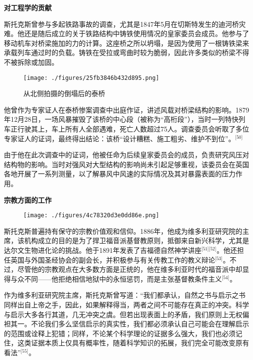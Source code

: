 \textbf{对工程学的贡献}

斯托克斯曾参与多起铁路事故的调查，尤其是1847年5月在切斯特发生的迪河桥灾难。他还是随后成立的关于铁路结构中铸铁使用情况的皇家委员会成员。他参与了移动机车对桥梁施加的力的计算。这座桥之所以坍塌，是因为使用了一根铸铁梁来承载列车通过时的负载。铸铁在受拉或弯曲时较为脆弱，因此许多类似的桥梁不得不被拆除或加固。
\begin{figure}[ht]
\centering
\texttt{[image: ./figures/25fb3846b432d895.png]}
\caption{从北侧拍摄的倒塌后的泰桥} \label{fig_QZstks_8}
\end{figure}
他曾作为专家证人在泰桥惨案调查中出庭作证，讲述风载对桥梁结构的影响。1879年12月28日，一场风暴摧毁了该桥的中心段（被称为“高桁段”），当时一列特快列车正行驶其上，车上所有人全部遇难，死亡人数超过75人。调查委员会听取了多位专家证人的证词，最终得出结论：该桥“设计糟糕、施工粗劣、维护不到位”。\(^\text{[50]}\)

由于他在此次调查中的证词，他被任命为后续皇家委员会的成员，负责研究风压对结构物的影响。当时对强风对大型结构的影响尚未引起足够重视，该委员会在英国各地开展了一系列测量，以了解暴风中风速的实际情况及其对暴露表面的压力作用。

\textbf{宗教方面的工作}

\begin{figure}[ht]
\centering
\texttt{[image: ./figures/4c78320d3e0dd86e.png]}
\caption{} \label{fig_QZstks_9}
\end{figure}
斯托克斯普遍持有保守的宗教价值观和信仰。1886年，他成为维多利亚研究院的主席，该机构成立的目的是为了捍卫福音派基督教原则，抵御来自新兴科学，尤其是达尔文生物进化论的挑战。他于1891年发表了吉福德自然神学讲座\(^\text{[51][52]}\)。他还担任英国与外国圣经协会的副会长，并积极参与有关传教工作的教义辩论\(^\text{[53]}\)。不过，尽管他的宗教观点在大多数方面是正统的，他在维多利亚时代的福音派中却显得与众不同——他拒绝相信地狱中的永恒惩罚，而是主张基督教条件主义\(^\text{[54]}\)。

作为维多利亚研究院主席，斯托克斯曾写道：“我们都承认，自然之书与启示之书同样出自上帝之手，因此，如果解释得当，两者之间不可能存在真正的冲突。科学与启示大多各行其道，几无冲突之虞。但若出现表面上的矛盾，我们原则上无权偏袒其一。不论我们多么坚信启示的真实性，我们都必须承认自己可能会在理解启示的范围或诠释上犯错；同样，不论某个科学理论的证据多么强大，我们也必须记住，这类证据本质上仅具有概率性，随着科学知识的拓展，我们完全可能改变原有看法”\(^\text{[55]}\)。


